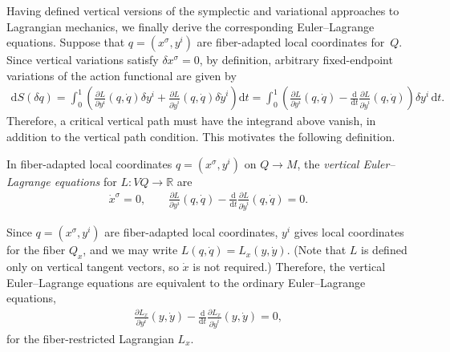 \documentclass[10pt,a4paper]{amsart}
\numberwithin{equation}{section}
\begin{document}
Having def\/ined vertical versions of the symplectic and variational approaches to Lagrangian mechanics, we f\/inally derive the corresponding Euler--Lagrange equations. Suppose that $ q = ( x ^\sigma , y ^i ) $ are f\/iber-adapted local coordinates for~$Q$. Since vertical variations satisfy $ \delta x ^\sigma = 0 $, by def\/inition, arbitrary f\/ixed-endpoint variations of the action functional are given by
\begin{gather*}
 \mathrm{d} S ( \delta q )= \int _0 ^1 \left( \frac{ \partial L }{ \partial y ^i } ( q, \dot{q} ) \delta y ^i + \frac{ \partial L }{ \partial \dot{y} ^i } ( q, \dot{q} ) \delta \dot{y} ^i \right) \mathrm{d}t = \int _0 ^1 \left( \frac{ \partial L }{ \partial y ^i } ( q, \dot{q} ) - \frac{\mathrm{d}}{\mathrm{d}t} \frac{ \partial L }{ \partial \dot{y} ^i } ( q, \dot{q} ) \right) \delta y ^i
 \,\mathrm{d}t .
\end{gather*}
Therefore, a critical vertical path must have the integrand above vanish, in addition to the vertical path condition. This motivates the following def\/inition.

\begin{Definition}
 In f\/iber-adapted local coordinates $ q = ( x ^\sigma , y ^i ) $ on $Q \rightarrow M $, the \emph{vertical Euler--Lagrange equations} for $ L \colon V Q \rightarrow \mathbb{R} $ are
 \begin{gather} \label{eqn:verticalEL}
 \dot{x} ^\sigma = 0 , \qquad \frac{ \partial L }{ \partial y ^i } ( q, \dot{q} ) - \frac{\mathrm{d}}{\mathrm{d}t} \frac{ \partial L }{ \partial \dot{y}
 ^i } ( q, \dot{q} ) = 0 .
\end{gather}
\end{Definition}

\begin{Remark} Since $ q = ( x ^\sigma , y ^i ) $ are f\/iber-adapted local coordinates, $ y ^i $ gives local coordinates for the f\/iber $ Q _x $, and we may write $ L ( q, \dot{q} ) = L _x ( y , \dot{y} ) $. (Note that $L$ is def\/ined only on vertical tangent vectors, so $ \dot{x} $ is not required.) Therefore, the vertical Euler--Lagrange equations are equivalent to the ordinary Euler--Lagrange equations,
 \begin{gather*}
 \frac{ \partial L _x }{ \partial y ^i } ( y , \dot{y} ) - \frac{\mathrm{d}}{\mathrm{d}t} \frac{ \partial L _x }{ \partial \dot{y} ^i } ( y , \dot{y} ) = 0 ,
 \end{gather*}
 for the f\/iber-restricted Lagrangian $ L _x $.
\end{Remark}
\end{document}
